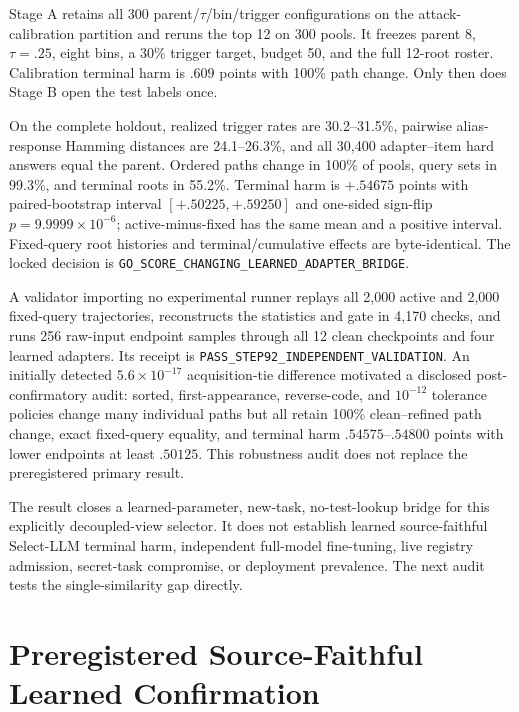 Stage A retains all 300 parent/$\tau$/bin/trigger configurations on the attack-calibration partition and reruns the top 12 on 300 pools. It freezes parent 8, $\tau=.25$, eight bins, a 30\% trigger target, budget 50, and the full 12-root roster. Calibration terminal harm is $.609$ points with 100\% path change. Only then does Stage B open the test labels once.



On the complete holdout, realized trigger rates are 30.2--31.5\%, pairwise alias-response Hamming distances are 24.1--26.3\%, and all 30,400 adapter--item hard answers equal the parent. Ordered paths change in 100\% of pools, query sets in 99.3\%, and terminal roots in 55.2\%. Terminal harm is $+.54675$ points with paired-bootstrap interval $[+.50225,+.59250]$ and one-sided sign-flip $p=9.9999\times10^{-6}$; active-minus-fixed has the same mean and a positive interval. Fixed-query root histories and terminal/cumulative effects are byte-identical. The locked decision is \texttt{GO\_SCORE\_CHANGING\_LEARNED\_ADAPTER\_BRIDGE}.

A validator importing no experimental runner replays all 2,000 active and 2,000 fixed-query trajectories, reconstructs the statistics and gate in 4,170 checks, and runs 256 raw-input endpoint samples through all 12 clean checkpoints and four learned adapters. Its receipt is \texttt{PASS\_STEP92\_INDEPENDENT\_VALIDATION}. An initially detected $5.6\times10^{-17}$ acquisition-tie difference motivated a disclosed post-confirmatory audit: sorted, first-appearance, reverse-code, and $10^{-12}$ tolerance policies change many individual paths but all retain 100\% clean--refined path change, exact fixed-query equality, and terminal harm $.54575$--$.54800$ points with lower endpoints at least $.50125$. This robustness audit does not replace the preregistered primary result.

The result closes a learned-parameter, new-task, no-test-lookup bridge for this explicitly decoupled-view selector. It does not establish learned source-faithful Select-LLM terminal harm, independent full-model fine-tuning, live registry admission, secret-task compromise, or deployment prevalence. The next audit tests the single-similarity gap directly.

\section{Preregistered Source-Faithful Learned Confirmation}
\label{app:step93}

